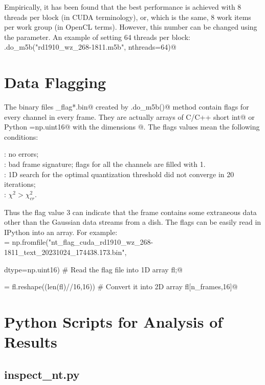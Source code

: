 \documentclass[letterpaper,twoside,12pt]{article}
\begin{document}
Empirically, it has been found that the best performance is achieved 
with 8 threads per block (in CUDA terminology), or, which is the same, 
8 work items per work group (in OpenCL terms). However, this number can 
be changed using the \verb@nthreads@ parameter. An example of setting 64 threads per block: \\

\noindent \verb@nt.do_m5b("rd1910_wz_268-1811.m5b", nthreads=64)@ 


\section{Data Flagging}

The binary files \verb@nt_flag*.bin@ created by \verb@Normtest.do_m5b()@ method contain flags for every channel in every frame. They are actually arrays of C/C++ \verb@unsigned short int@ or Python \verb@dtype=np.uint16@ with the dimensions \verb@[n_frames,16]@. The flags values mean the following conditions:
 
: no errors; \\
: bad frame signature; flags for all the channels are filled with 1.  \\
: 1D search for the optimal quantization threshold did not converge in 20 iterations; \\
: $\chi^2 > \chi^2_{cr}$.

\noindent Thus the flag value 3 can indicate that the frame contains some extraneous data other than the Gaussian data streams from a dish. The flags can be easily read in IPython into an array. For example: \\

\noindent \verb@fl = np.fromfile("nt_flag_cuda_rd1910_wz_268-1811_text_20231024_174438.173.bin", \@ \par
\noindent \verb@                 dtype=np.uint16)  # Read the flag file into 1D array fl;@ \par
\noindent \verb@fl = fl.reshape((len(fl)//16,16)) # Convert it into 2D array fl[n_frames,16]@  \par



\section{Python Scripts for Analysis of Results}

\subsection{inspect\_nt.py}
\end{document}

